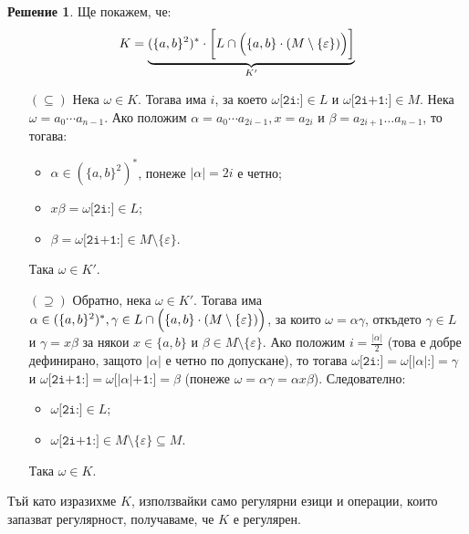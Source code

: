 \documentclass{article}
\theoremstyle{definition}
\newtheorem*{solution}{Решение}
\begin{document}
\begin{solution}
    Ще покажем, че:
    \[
        K = \underbrace{(\{ a, b \}^2)^* \cdot \biggl[ L \cap \Bigl(\{ a, b \} \cdot (M \setminus \{ \varepsilon \})\Bigr) \biggr]}_{K'}
    \]
    \begin{itemize}
        \item[$(\subseteq)$] Нека $\omega \in K$.
              Тогава има $i$, за което $\omega\texttt{[2i:]} \in L$ и $\omega\texttt{[2i+1:]} \in M$.
              Нека $\omega = a_0 \cdots a_{n - 1}$.
              Ако положим $\alpha = a_0 \cdots a_{2i - 1}, x = a_{2i}$ и $\beta = a_{2i + 1} \dots a_{n - 1}$, то тогава:
              \begin{itemize}
                  \item $\alpha \in (\{ a, b \}^2)^*$, понеже $|\alpha| = 2i$ е четно;
                  \item $x \beta = \omega\texttt{[2i:]} \in L$;
                  \item $\beta = \omega\texttt{[2i+1:]} \in M \setminus \{ \varepsilon \}$.
              \end{itemize}
              Така $\omega \in K'$.
        \item[$(\supseteq)$] Обратно, нека $\omega \in K'$.
              Тогава има $\alpha \in (\{ a, b \}^2)^*, \gamma \in L \cap \Bigl(\{ a, b \} \cdot (M \setminus \{ \varepsilon \})\Bigr)$, за които $\omega = \alpha \gamma$, откъдето $\gamma \in L$ и $\gamma = x \beta$ за някои $x \in \{ a, b \}$ и $\beta \in M \setminus \{ \varepsilon \}$.
              Ако положим $i = \frac{|\alpha|}{2}$ (това е добре дефинирано, защото $|\alpha|$ е четно по допускане), то тогава $\omega\texttt{[2i:]} = \omega\texttt{[}|\alpha|\texttt{:]} = \gamma$ и $\omega\texttt{[2i+1:]} = \omega\texttt{[}|\alpha|\texttt{+1:]} = \beta$ (понеже $\omega = \alpha \gamma = \alpha x \beta$).
              Следователно:
              \begin{itemize}
                  \item $\omega\texttt{[2i:]} \in L$;
                  \item $\omega\texttt{[2i+1:]} \in M \setminus \{ \varepsilon \} \subseteq M$.
              \end{itemize}
              Така $\omega \in K$.
    \end{itemize}
    Тъй като изразихме $K$, използвайки само регулярни езици и операции, които запазват регулярност, получаваме, че $K$ е регулярен.
\end{solution}
\end{document}
